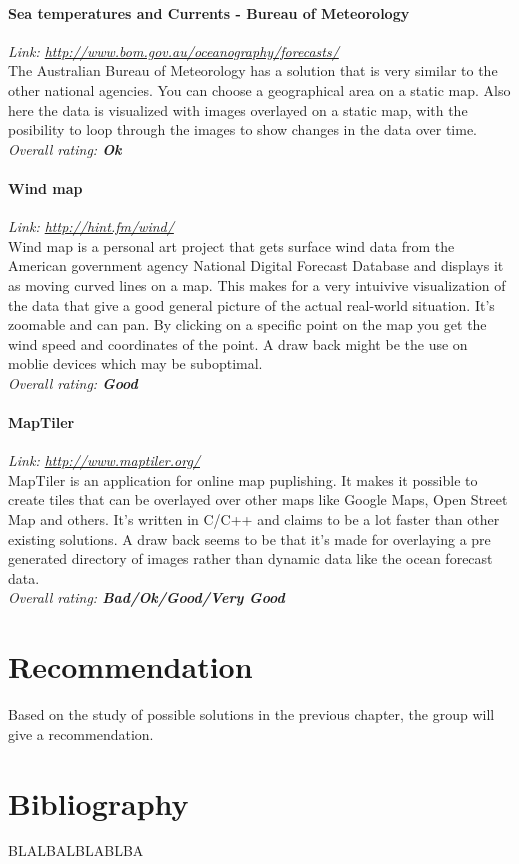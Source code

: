 \documentclass[11pt,a4paper,titlepage,oneside]{report}
\begin{document}
\subsubsection{Sea temperatures and Currents - Bureau of Meteorology}
\emph{Link: \url{http://www.bom.gov.au/oceanography/forecasts/}} \\%
  The Australian Bureau of Meteorology has a solution that is very similar to the other national agencies. You can choose a geographical area on a static map. Also here the data is visualized with images overlayed on a static map, with the posibility to loop through the images to show changes in the data over time.
\\ \emph{Overall rating: \textbf{Ok}}

\subsubsection{Wind map}
\emph{Link: \url{http://hint.fm/wind/}} \\%
  Wind map is a personal art project that gets surface wind data from the American government agency National Digital Forecast Database and displays it as moving curved lines on a map. This makes for a very intuivive visualization of the data that give a good general picture of the actual real-world situation. It's zoomable and can pan. By clicking on a specific point on the map you get the wind speed and coordinates of the point. A draw back might be the use on moblie devices which may be suboptimal.
\\ \emph{Overall rating: \textbf{Good}}

\subsubsection{MapTiler}
\emph{Link: \url{http://www.maptiler.org/}} \\%
  MapTiler is an application for online map puplishing. It makes it possible to create tiles that can be overlayed over other maps like Google Maps, Open Street Map and others. It's written in C/C++ and claims to be a lot faster than other existing solutions. A draw back seems to be that it's made for overlaying a pre generated directory of images rather than dynamic data like the ocean forecast data.
\\ \emph{Overall rating: \textbf{Bad/Ok/Good/Very Good}}


\chapter{Recommendation}
Based on the study of possible solutions in the previous chapter, the group will give a recommendation.

\chapter{Bibliography}

\begin{flushleft}
	
	 BLALBALBLABLBA
\end{flushleft}

\appendix
\end{document}
